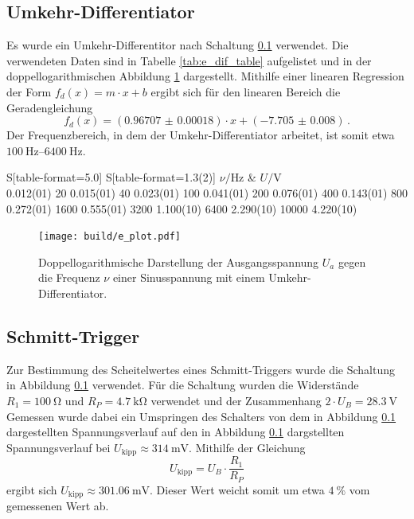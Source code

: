 \subsection{Umkehr-Differentiator}
Es wurde ein Umkehr-Differentitor nach Schaltung \ref{} verwendet.
Die verwendeten Daten sind in Tabelle \ref{tab:e_dif_table} aufgelistet und in der doppellogarithmischen Abbildung \ref{fig:e_dif_fig} dargestellt.
Mithilfe einer linearen Regression der Form $f_{d}(x) = m \cdot x + b$ ergibt sich für den linearen Bereich die Geradengleichung
\begin{equation*}
    f_{d}(x) = (\num{0.96707(18)}) \cdot x + (\num{-7.705(8)})\,.
\end{equation*}
Der Frequenzbereich, in dem der Umkehr-Differentiator arbeitet, ist somit etwa $\SIrange{100}{6400}{\hertz}$.

\begin{table}[!h]
    \centering
    \caption{Aufgenommene Ausgangsspannungen $U_a$ einer Sinusspannung in Abhängigkeit der Frequenz $\nu$ mit einem Umkehr-Differentiator.}
    \label{tab:e_dif_table}
    \begin{tabular}{S[table-format=5.0] S[table-format=1.3(2)]}
    \toprule 
        {$\nu/\si{\hertz}$} & {$U/\si{\volt}$} \\
       0.012(01)
           20   0.015(01)
           40   0.023(01)
          100   0.041(01)
          200   0.076(01)
          400   0.143(01)
          800   0.272(01)
         1600   0.555(01)
         3200   1.100(10)
         6400   2.290(10)
        10000   4.220(10)
    \bottomrule
    \end{tabular}
\end{table}

\begin{figure}[!h]
    \centering
    \texttt{[image: build/e\_plot.pdf]}
    \caption{Doppellogarithmische Darstellung der Ausgangsspannung $U_a$ gegen die Frequenz $\nu$ einer Sinusspannung mit einem Umkehr-Differentiator.}
    \label{fig:e_dif_fig}
\end{figure}

\subsection{Schmitt-Trigger} %
\label{sub:schmitt_trigger}

Zur Bestimmung des Scheitelwertes eines Schmitt-Triggers wurde die Schaltung in Abbildung \ref{} verwendet.
Für die Schaltung wurden die Widerstände $R_1 = \SI{100}{\ohm}$ und $R_P = \SI{4.7}{\kilo\ohm}$ verwendet und der Zusammenhang $2 \cdot U_B = \SI{28.3}{\volt}$
Gemessen wurde dabei ein Umspringen des Schalters von dem in Abbildung \ref{} dargestellten Spannungsverlauf auf den in Abbildung \ref{} dargstellten Spannungsverlauf bei $U_\text{kipp} \approx \SI{314}{\milli\volt}$.
Mithilfe der Gleichung
\begin{equation*}
    U_\text{kipp} = U_B \cdot \frac{R_1}{R_P} 
\end{equation*}
ergibt sich $U_\text{kipp} \approx \SI{301.06}{\milli\volt}$.
Dieser Wert weicht somit um etwa $\SI{4}{\percent}$ vom gemessenen Wert ab.

